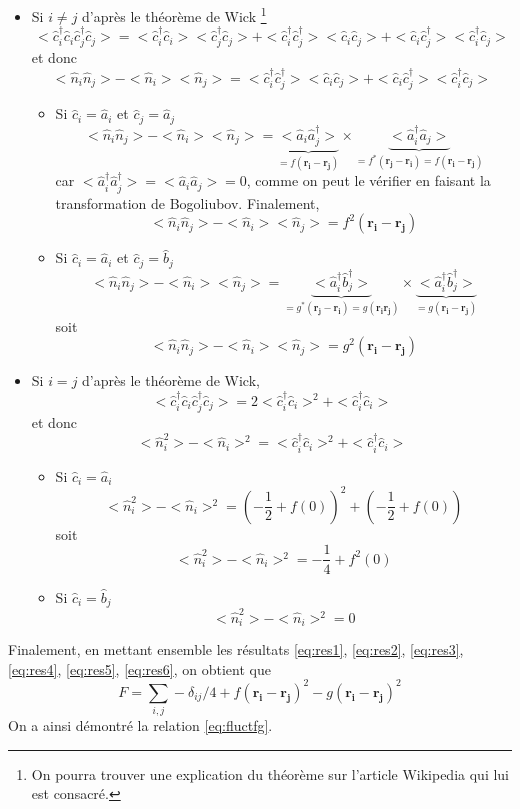 \documentclass[a4paper, french]{report}
\newcommand{\an}{\hat{a}}
\newcommand{\cre}{\hat{a}^\dagger}
\newcommand{\ban}{\hat{b}}
\newcommand{\bcre}{\hat{b}^\dagger}
\newcommand{\pos}[1]{\ensuremath{\mathbf{r_{#1}}}\xspace}
\newcommand{\1}{\ensuremath{\ket{\om_1\bom_1}}\xspace}
\newcommand{\2}{\ensuremath{\ket{\om_2\bom_2}}\xspace}
\newcommand{\can}{\hat{c}}
\newcommand{\ccre}{\hat{c}^\dagger}
\newcommand{\ene}{\hat n}
\begin{document}
\begin{itemize}
\item Si $i \neq j$
d'après le théorème de Wick \footnote{On pourra trouver une explication du théorème sur l'article Wikipedia qui lui est consacré.}
\[
	<\ccre_i\can_i\ccre_j\can_j>=<\ccre_i\can_i><\ccre_j\can_j>+<\ccre_i\ccre_j><\can_i\can_j>+<\can_i\ccre_j><\ccre_i\can_j>
\]
et donc 
\[
	<\ene_i\ene_j>-<\ene_i><\ene_j>=<\ccre_i\ccre_j><\can_i\can_j>+<\can_i\ccre_j><\ccre_i\can_j>
\]
	\begin{itemize}
	\item Si $\can_i=\an_i$ et $\can_j=\an_j$
	\[
		<\ene_i\ene_j>-<\ene_i><\ene_j>=\underbrace{<\an_i\cre_j>}_{=f(\pos i - \pos j)} \times \underbrace{<\cre_i\an_j>}_{=f^*(\pos j -\pos i)=f(\pos i - \pos j)}
	\]
	car $<\cre_i\cre_j>=<\an_i\an_j>=0$, comme on peut le vérifier en faisant la transformation de Bogoliubov.
	Finalement,
	\begin{equation}
	\label{eq:res3}
		<\ene_i\ene_j>-<\ene_i><\ene_j>=f^2(\pos i - \pos j)
	\end{equation}
	\item Si $\can_i = \an_i$ et $\can_j = \ban_j$
	\[
		<\ene_i\ene_j>-<\ene_i><\ene_j>=\underbrace{<\cre_i\bcre_j>}_{=g^*(\pos j - \pos i)=g(\pos i \pos j)} \times \underbrace{<\cre_i\bcre_j>}_{=g(\pos i - \pos j)}
	\]
	soit 
	\begin{equation}
	\label{eq:res4}
		<\ene_i\ene_j>-<\ene_i><\ene_j>=g^2(\pos i - \pos j)
	\end{equation}
	\end{itemize}
\item Si $i = j$
d'après le théorème de Wick,
\[
	<\ccre_i\can_i\ccre_j\can_j>=2<\ccre_i\can_i>^2+<\ccre_i\can_i>
\]
et donc
\[
	<\ene_i^2>-<\ene_i>^2=<\ccre_i\can_i>^2+<\ccre_i\can_i>
\]
	\begin{itemize}
	\item Si $\can_i = \an_i$
	\[
		<\ene_i^2>-<\ene_i>^2=\left(-\frac{1}{2}+f(0)\right)^2+\left(-\frac{1}{2}+f(0)\right)
	\]
	soit
	\begin{equation}
	\label{eq:res5}
		<\ene_i^2>-<\ene_i>^2=-\frac{1}{4}+f^2(0)
	\end{equation}
	\item Si $\can_i = \ban_j$
	\begin{equation}
	\label{eq:res6}
		<\ene_i^2>-<\ene_i>^2=0
	\end{equation}
	\end{itemize}
\end{itemize}
Finalement, en mettant ensemble les résultats \ref{eq:res1}, \ref{eq:res2}, \ref{eq:res3}, \ref{eq:res4}, \ref{eq:res5}, \ref{eq:res6}, on obtient que 
\begin{equation}
	F=\sum_{i,j} -\delta_{ij}/4+f(\pos{i}-\pos{j})^2-g(\pos{i}-\pos{j})^2
\end{equation}
On a ainsi démontré la relation \ref{eq:fluctfg}.
\end{document}

